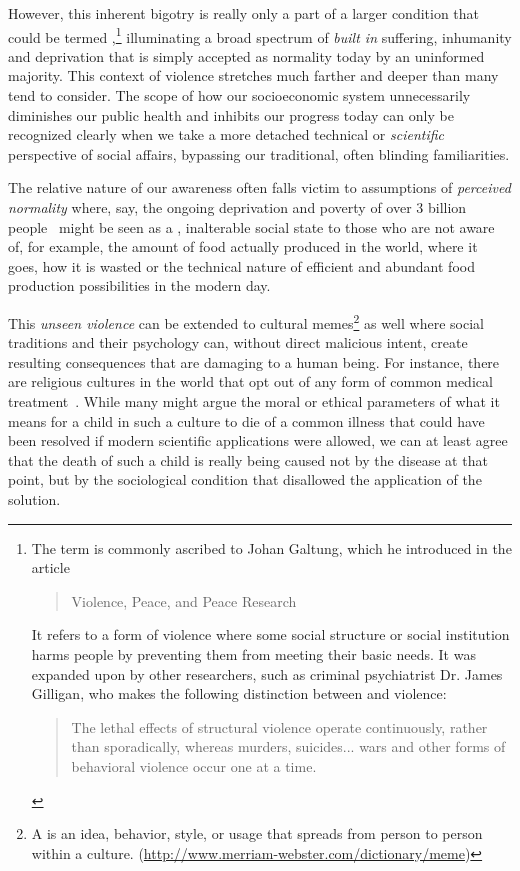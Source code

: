 \documentclass[10pt, a4paper, cleardoubleempty, openright, twoside]{book}
\begin{document}
However, this inherent bigotry is really only a part of a larger
condition that could be termed ,\footnote{
	The term  is commonly ascribed to Johan
	Galtung, which he introduced in the article
	\blockcquote{Galtung:JPeaceRes:69}{Violence, Peace, and Peace
	Research}. It refers to a form of violence where some social structure
	or social institution harms people by preventing them from meeting
	their basic needs. It was expanded upon by other researchers, such as
	criminal psychiatrist Dr.  James Gilligan, who makes the following
	distinction between  and 
	violence: \blockcquote[p.~192]{Gilligan::96}{The lethal effects of
	structural violence operate continuously, rather than sporadically,
	whereas murders, suicides... wars and other forms of behavioral
	violence occur one at a time.}
}
illuminating a broad spectrum of \emph{built in} suffering, inhumanity
and deprivation that is simply accepted as normality today by an
uninformed majority. This context of violence stretches much farther and
deeper than many tend to consider. The scope of how our socioeconomic
system unnecessarily diminishes our public health and inhibits our
progress today can only be recognized clearly when we take a more
detached technical or \emph{scientific} perspective of social affairs,
bypassing our traditional, often blinding familiarities.

The relative nature of our awareness often falls victim to assumptions
of \emph{perceived normality} where, say, the ongoing deprivation and
poverty of over 3 billion people~\cite{Shah:http:14} might be seen as a
, inalterable social state to those who are not aware
of, for example, the amount of food actually produced in the world,
where it goes, how it is wasted or the technical nature of efficient and
abundant food production possibilities in the modern day.

This \emph{unseen violence} can be extended to cultural memes\footnote{
	A  is an idea, behavior, style, or usage that spreads
	from person to person within a culture.
	(\url{http://www.merriam-webster.com/dictionary/meme})	
}
as well where social traditions and their psychology can, without direct
malicious intent, create resulting consequences that are damaging to a
human being. For instance, there are religious cultures in the world
that opt out of any form of common medical
treatment~\cite{FamilyGP:http:14}. While many might argue the moral or
ethical parameters of what it means for a child in such a culture to die
of a common illness that could have been resolved if modern scientific
applications were allowed, we can at least agree that the death of such
a child is really being caused not by the disease at that point, but by
the sociological condition that disallowed the application of the
solution.
\end{document}

